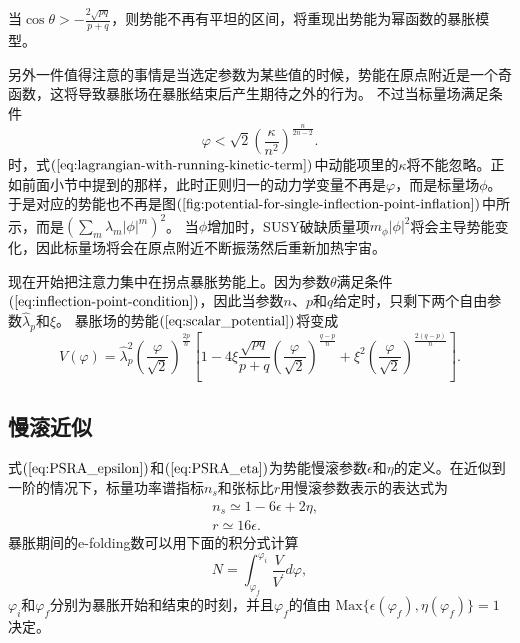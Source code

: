 当$\cos\theta > -
\frac{2\sqrt{pq}}{p+q}$，则势能不再有平坦的区间，将重现出势能为幂函数的暴胀模型。

另外一件值得注意的事情是当选定参数为某些值的时候，势能在原点附近是一个奇函数，这将导致暴胀场在暴胀结束后产生期待之外的行为。
不过当标量场满足条件
\begin{equation}
  \varphi < \sqrt{2} {\left(\frac{\kappa}{n^2}\right)}^{\frac{n}{2n-2}}.
\end{equation}
时，式$(\ref{eq:lagrangian-with-running-kinetic-term})$中动能项里的$\kappa$将不能忽略。正如前面小节中提到的那样，此时正则归一的动力学变量不再是$\varphi$，而是标量场$\phi$。于是对应的势能也不再是图$(\ref{fig:potential-for-single-inflection-point-inflation})$中所示，而是${\left(\sum_m
\lambda_m \left\lvert \phi \right\rvert^{m}\right)}^2$。
当$\phi$增加时，SUSY破缺质量项$m_{\phi}\left\lvert \phi\right\rvert
^2$将会主导势能变化\citep{nakayama2010running}，因此标量场将会在原点附近不断振荡然后重新加热宇宙。

现在开始把注意力集中在拐点暴胀势能上。因为参数$\theta$满足条件$(\ref{eq:inflection-point-condition})$，因此当参数$n$、$p$和$q$给定时，只剩下两个自由参数$\hat{\lambda}_{p}$和$\xi$。
暴胀场的势能$(\ref{eq:scalar_potential})$将变成
\begin{equation}
  \label{eq:inflection-poin-potential}
  V(\varphi) = \hat{\lambda}^2_{p}
  {\left(\frac{\varphi}{\sqrt{2}}\right)}^{\frac{2p}{n}} 
  \left[ 1-4\xi \frac{\sqrt{pq}}{p+q}
  {\left(\frac{\varphi}{\sqrt{2}}\right)}^{\frac{q-p}{n}} + \xi^2 
{\left(\frac{\varphi}{\sqrt{2}}\right)}^{\frac{2(q-p)}{n}}\right].
\end{equation}

\subsection{慢滚近似}
式$(\ref{eq:PSRA_epsilon})$和$(\ref{eq:PSRA_eta})$为势能慢滚参数$\epsilon$和$\eta$的定义。在近似到一阶的情况下，标量功率谱指标$n_{s}$和张标比$r$用慢滚参数表示的表达式为
\begin{align}
  \label{eq:ns-in-slow-roll-parameter}
  & n_{s} \simeq 1 - 6\epsilon + 2\eta, \\
  \label{eq:eta-in-slow-roll-parameter}
  & r \simeq 16\epsilon.
\end{align}
暴胀期间的e-folding数可以用下面的积分式计算
\begin{equation}
  \label{eq:e-folding-number-with-potential-integral}
  N = \int_{\varphi_{f}}^{\varphi_{i}} \frac{V}{V^\prime} d\varphi, 
\end{equation}
$\varphi_{i}$和$\varphi_{f}$分别为暴胀开始和结束的时刻，并且$\varphi_{f}$的值由
$\text{Max} \{\epsilon(\varphi_{f}), \eta(\varphi_{f})\}=1$决定。

